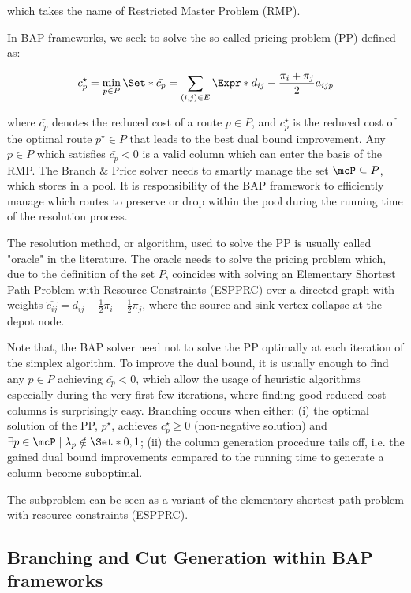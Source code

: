 which takes the name of Restricted Master Problem (RMP).

In BAP frameworks, we seek to solve the so-called pricing problem (PP) defined as:

\begin{equation}
	{c^\star_p} = \min_{p \in P} \Set*{ \bar{c_p} = \sum_{(i, j) \in E} \Expr*{d_{ij} - \frac{\pi_i + \pi_j}{2}} a_{ijp}  }
\end{equation}

where $\bar{c_p}$ denotes the reduced cost of a route $p \in P$, and $c^\star_p$ is the reduced cost of the optimal route $p^\star \in P$ that leads to the best dual bound improvement.
Any $p \in P$ which satisfies $\bar{c_p} < 0$ is a valid column which can enter the basis of the RMP.
The Branch \& Price solver needs to smartly manage the set $\mcP \subseteq P$, which stores in a pool.
It is responsibility of the BAP framework to efficiently manage which routes to preserve or drop within the pool during the running time of the resolution process.

The resolution method, or algorithm, used to solve the PP is usually called "oracle" in the literature.
The oracle needs to solve the pricing problem which, due to the definition of the set $P$, coincides with solving an Elementary Shortest Path Problem with Resource Constraints (ESPPRC) over a directed graph with weights $\hat{c_{ij}} = d_{ij} - \frac{1}{2} \pi_i - \frac{1}{2} \pi_j$, where the source and sink vertex collapse at the depot node.

Note that, the BAP solver need not to solve the PP optimally at each iteration of the simplex algorithm.
To improve the dual bound, it is usually enough to find any $p \in P$ achieving $\bar{c_p} < 0$, which allow the usage of heuristic algorithms especially during the very first few iterations, where finding good reduced cost columns is surprisingly easy.
Branching occurs when either: (i) the optimal solution of the PP, $p^\star$, achieves $c^\star_p \ge 0$ (non-negative solution) and $\exists p \in \mcP \mid \lambda_p \notin \Set*{0, 1}$; (ii) the column generation procedure tails off, i.e. the gained dual bound improvements compared to the running time to generate a column become suboptimal.

The subproblem can be seen as a variant of the elementary shortest path problem with resource constraints (ESPPRC).

\subsection{Branching and Cut Generation within BAP frameworks}
\label{sec:intro-branching-and-cut-generation-within-bap-frameworks}

